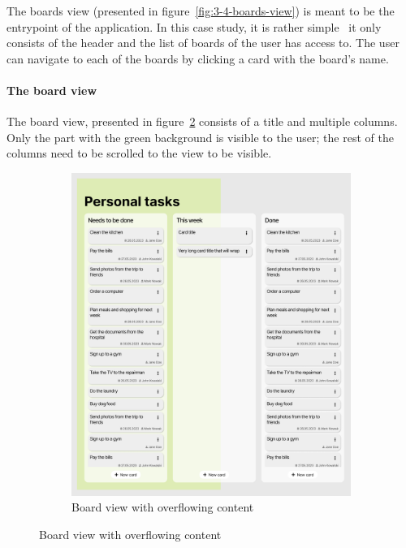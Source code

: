 The boards view (presented in figure~\ref{fig:3-4-boards-view}) is meant to be the entrypoint of the application.
In this case study, it is rather simple \textendash\ it only consists of the header and the list of boards of the user has access to.
The user can navigate to each of the boards by clicking a card with the board's name.

\paragraph{The board view}
The board view, presented in figure~\ref{fig:3-4-board-view-expanded} consists of a title and multiple columns.
Only the part with the green background is visible to the user;
the rest of the columns need to be scrolled to the view to be visible.

\begin{figure}
    \centering
    \begin{subfigure}[m]{0.6\textwidth}
        \centering
        \includegraphics[height=0.4\textheight]{./3-research-methodology/board-view}
        \caption{Board view with overflowing content}
        \label{fig:3-4-board-view-expanded}
    \end{subfigure}

\end{figure}
